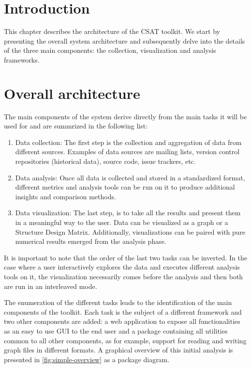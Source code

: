 
\section{Introduction}
\label{sec:design/intro}

This chapter describes the architecture of the CSAT toolkit. We start by presenting the overall system architecture and subsequently delve into the details of the three main components: the collection, visualization and analysis frameworks.


\section{Overall architecture}

The main components of the system derive directly from the main tasks it will be used for and are summrized in the following list:

\begin{enumerate}
    \item Data collection: The first step is the collection and aggregation of data from different sources. Examples of data sources are mailing lists, version control repositories (historical data), source code, issue trackers, etc.
    \item Data analysis: Once all data is collected and stored in a standardized format, different metrics and analysis tools can be run on it to produce additional insights and comparison methods.
    \item Data visualization: The last step, is to take all the results and present them in a meaningful way to the user. Data can be visualized as a graph or a Structure Design Matrix. Additionally, visualizations can be paired with pure numerical results emerged from the analysis phase.
\end{enumerate}

It is important to note that the order of the last two tasks can be inverted. In the case where a user interactively explores the data and executes different analysis tools on it, the visualization necessarily comes before the analysis and then both are run in an interleaved mode.

The enumeration of the different tasks leads to the identification of the main components of the toolkit. Each task is the subject of a different framework and two other components are added: a web application to expose all functionalities as an easy to use GUI to the end user and a package containing all utilities common to all other components, as for example, support for reading and writing graph files in different formats. A graphical overview of this initial analysis is presented in \vref{fig:simple-overview} as a package diagram.

